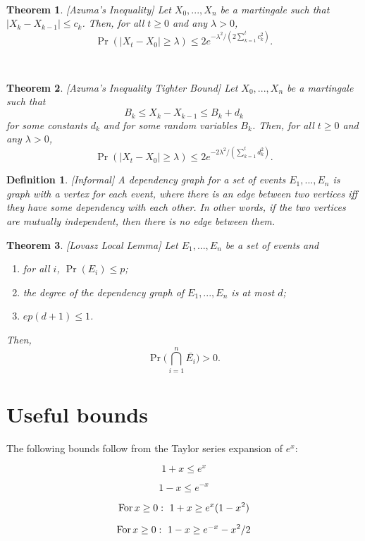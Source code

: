 \documentclass[11pt]{article}
\theoremstyle{mytheoremstyle}
\newtheorem{theorem}{Theorem}
\newtheorem{definition}{Definition}
\begin{document}
~
\begin{theorem}
	\emph{{[}Azuma's Inequality{]}} Let $X_{0},...,X_{n}$ be a martingale
	such that $|X_{k}-X_{k-1}|\leq c_{k}$. Then, for all $t\geq0$ and
	any $\lambda>0$,
	\[
	\Pr(|X_{t}-X_{0}|\geq\lambda)\leq2e^{-\lambda^{2}/(2\sum_{k=1}^{t}c_{k}^{2})}.
	\]
\end{theorem}
~
\begin{theorem}
	\emph{{[}Azuma's Inequality \textendash{} Tighter Bound{]} }Let $X_{0},...,X_{n}$
	be a martingale such that 
	\[
	B_{k}\leq X_{k}-X_{k-1}\leq B_{k}+d_{k}
	\]
	for some constants $d_{k}$ and for some random variables $B_{k}$.
	Then, for all $t\geq0$ and any $\lambda>0$,
	\[
	\Pr(|X_{t}-X_{0}|\geq\lambda)\leq2e^{-2\lambda^{2}/(\sum_{k=1}^{t}d_{k}^{2})}.
	\]
\end{theorem}
\begin{definition}
	{[}Informal{]} A \emph{dependency graph} for a set of events $E_{1},...,E_{n}$
	is graph with a vertex for each event, where there is an edge between
	two vertices iff they have some dependency with each other. In other
	words, if the two vertices are mutually independent, then there is
	no edge between them.
\end{definition}
\begin{theorem}
	\emph{{[}Lovasz Local Lemma{]} }Let $E_{1},...,E_{n}$ be a set of
	events and 
	
	\begin{enumerate}
		\item for all $i$, $\Pr(E_{i})\leq p$;
		\item \textup{\emph{the degree of the dependency graph of $E_{1},...,E_{n}$
				is at most $d$;}}
		\item $ep(d+1)\leq1$.
	\end{enumerate}
	Then,
	\[
	\Pr\big(\bigcap_{i=1}^{n}\bar{E_{i}}\big)>0.
	\]
	
\end{theorem}

\section*{Useful bounds}

The following bounds follow from the Taylor series expansion of $e^{x}$:

\[
1+x\leq e^{x}
\]

\[
1-x\leq e^{-x}
\]

\[
\text{{For\,}}x\geq0:\,\,1+x\geq e^{x}(1-x^{2})
\]

\[
\text{{For\,}}x\geq0:\,\,1-x\geq e^{-x}-x^{2}/2
\]


\end{document}
